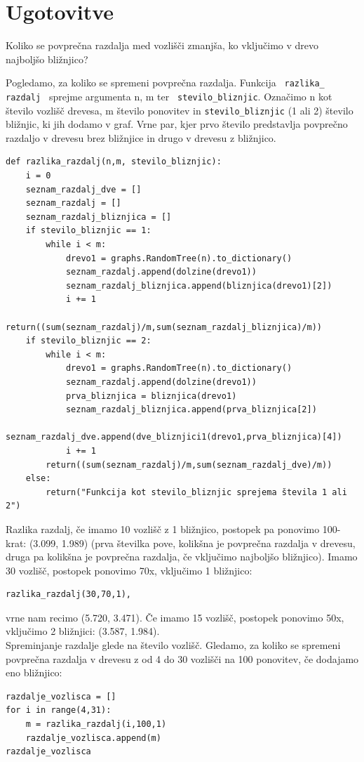 \documentclass[a4paper,10pt]{article}
\begin{document}
{\section{Ugotovitve}
 Koliko se povprečna razdalja med vozlišči zmanjša, ko vključimo v drevo najboljšo bližnjico?
\newline

Pogledamo, za koliko se spremeni povprečna razdalja. Funkcija \texttt{ razlika\_ razdalj } sprejme argumenta n, m ter \texttt{ stevilo\_bliznjic}. Označimo n kot število vozlišč drevesa, m število ponovitev in \texttt{stevilo\_bliznjic} (1 ali 2) število bližnjic, ki jih dodamo v graf. Vrne par, kjer prvo število predstavlja povprečno razdaljo v drevesu brez bližnjice in drugo v drevesu z bližnjico. 
\begin{verbatim}
def razlika_razdalj(n,m, stevilo_bliznjic):
    i = 0
    seznam_razdalj_dve = []
    seznam_razdalj = []
    seznam_razdalj_bliznjica = []
    if stevilo_bliznjic == 1:
        while i < m:
            drevo1 = graphs.RandomTree(n).to_dictionary()
            seznam_razdalj.append(dolzine(drevo1))
            seznam_razdalj_bliznjica.append(bliznjica(drevo1)[2])
            i += 1
        return((sum(seznam_razdalj)/m,sum(seznam_razdalj_bliznjica)/m))
    if stevilo_bliznjic == 2:
        while i < m:
            drevo1 = graphs.RandomTree(n).to_dictionary()
            seznam_razdalj.append(dolzine(drevo1))
            prva_bliznjica = bliznjica(drevo1)
            seznam_razdalj_bliznjica.append(prva_bliznjica[2])
            seznam_razdalj_dve.append(dve_bliznjici1(drevo1,prva_bliznjica)[4])
            i += 1
        return((sum(seznam_razdalj)/m,sum(seznam_razdalj_dve)/m))
    else:
        return("Funkcija kot stevilo_bliznjic sprejema števila 1 ali 2")
\end{verbatim}

Razlika razdalj, če imamo 10 vozlišč z 1 bližnjico, postopek pa ponovimo 100-krat:  (3.099, 1.989) (prva številka pove, kolikšna je povprečna razdalja v drevesu, druga pa kolikšna je povprečna razdalja, če vključimo najboljšo bližnjico).
\newline
Imamo 30 vozlišč, postopek ponovimo 70x, vključimo 1 bližnjico:
\begin{verbatim}
razlika_razdalj(30,70,1),
\end{verbatim}
vrne nam recimo (5.720, 3.471).
Če imamo 15 vozlišč, postopek ponovimo 50x, vključimo 2  bližnjici: (3.587, 1.984).
\\[0.5cm]
Spreminjanje razdalje glede na število vozlišč. Gledamo, za koliko se spremeni povprečna razdalja v drevesu z od 4 do 30 vozlišči na 100 ponovitev, če dodajamo eno bližnjico:
\begin{verbatim}
razdalje_vozlisca = []
for i in range(4,31):
    m = razlika_razdalj(i,100,1)
    razdalje_vozlisca.append(m)
razdalje_vozlisca
\end{verbatim}

}
\end{document}
